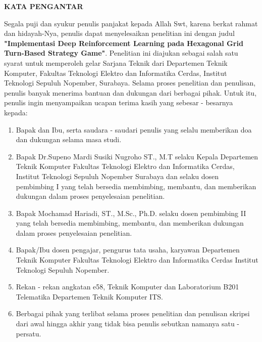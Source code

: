 \begin{center}
  \Large
  \textbf{KATA PENGANTAR}
\end{center}


\vspace{2ex}


Segala puji dan syukur penulis panjakat kepada Allah Swt,
karena berkat rahmat dan hidayah-Nya, penulis dapat menyelesaikan
penelitian ini dengan judul \textbf{"Implementasi Deep Reinforcement Learning pada Hexagonal Grid Turn-Based Strategy Game"}.
Penelitian ini diajukan sebagai salah satu syarat untuk memperoleh gelar Sarjana Teknik
dari Departemen Teknik Komputer, Fakultas Teknologi Elektro dan Informatika Cerdas, Institut
Teknologi Sepuluh Nopember, Surabaya. Selama proses penelitian dan penulisan, penulis
banyak menerima bantuan dan dukungan dari berbagai pihak. Untuk itu, penulis ingin menyampaikan
ucapan terima kasih yang sebesar - besarnya kepada:

\begin{enumerate}[nolistsep]

  \item Bapak dan Ibu, serta saudara - saudari penulis yang selalu memberikan doa dan dukungan selama masa studi.

  \item Bapak Dr.Supeno Mardi Susiki Nugroho ST., M.T selaku Kepala Departemen Teknik Komputer Fakultas Teknologi Elektro dan Informatika Cerdas, Institut Teknologi Sepuluh Nopember Surabaya dan selaku dosen pembimbing I yang telah bersedia membimbing, membantu, dan memberikan dukungan dalam proses penyelesaian penelitian.
  \item Bapak Mochamad Hariadi, ST., M.Sc., Ph.D. selaku dosen pembimbing II yang telah bersedia membimbing, membantu, dan memberikan dukungan dalam proses penyelesaian penelitian.
  \item Bapak/Ibu dosen pengajar, pengurus tata usaha, karyawan Departemen Teknik Komputer Fakultas Teknologi Elektro dan Informatika Cerdas Institut Teknologi Sepuluh Nopember.
  \item Rekan - rekan angkatan e58, Teknik Komputer dan Laboratorium B201 Telematika Departemen Teknik Komputer ITS.
  \item Berbagai pihak yang terlibat selama proses penelitian dan penulisan skripsi dari awal hingga akhir yang tidak bisa penulis sebutkan namanya satu - persatu.

\end{enumerate}

